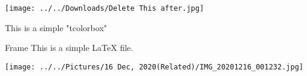 \documentclass[11 pt]{report}
\begin{document}
\texttt{[image: ../../Downloads/Delete This after.jpg]}

\begin{tcolorbox}
    This is a simple "tcolorbox"
\end{tcolorbox}

\begin{frame}{Frame}
    This is a simple \LaTeX{} file.
\end{frame}

\pagebreak

\texttt{[image: ../../Pictures/16 Dec, 2020(Related)/IMG\_20201216\_001232.jpg]}
\end{document}
